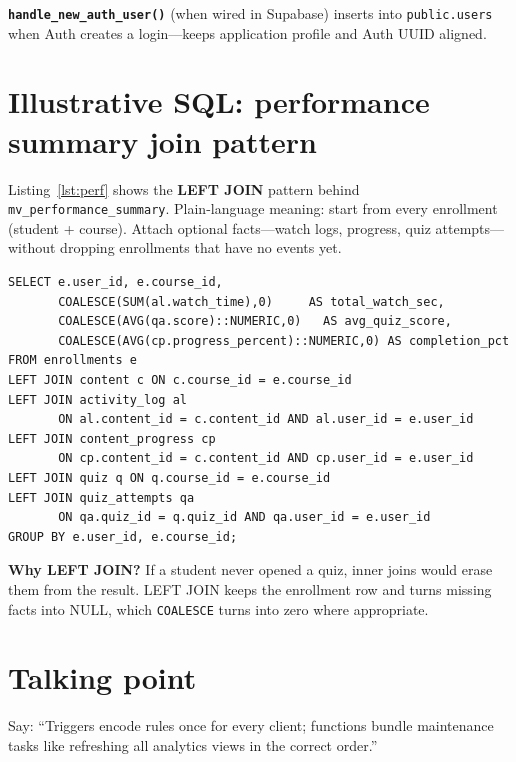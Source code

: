 \textbf{\texttt{handle\_new\_auth\_user()}} (when wired in Supabase) inserts into \texttt{public.users} when Auth creates a login---keeps application profile and Auth UUID aligned.

\section{Illustrative SQL: performance summary join pattern}
Listing~\ref{lst:perf} shows the \textbf{LEFT JOIN} pattern behind \texttt{mv\_performance\_summary}. Plain-language meaning: start from every enrollment (student + course). Attach optional facts---watch logs, progress, quiz attempts---without dropping enrollments that have no events yet.

\begin{lstlisting}[caption={Core join pattern for per-student per-course metrics (simplified)},label=lst:perf]
SELECT e.user_id, e.course_id,
       COALESCE(SUM(al.watch_time),0)     AS total_watch_sec,
       COALESCE(AVG(qa.score)::NUMERIC,0)   AS avg_quiz_score,
       COALESCE(AVG(cp.progress_percent)::NUMERIC,0) AS completion_pct
FROM enrollments e
LEFT JOIN content c ON c.course_id = e.course_id
LEFT JOIN activity_log al
       ON al.content_id = c.content_id AND al.user_id = e.user_id
LEFT JOIN content_progress cp
       ON cp.content_id = c.content_id AND cp.user_id = e.user_id
LEFT JOIN quiz q ON q.course_id = e.course_id
LEFT JOIN quiz_attempts qa
       ON qa.quiz_id = q.quiz_id AND qa.user_id = e.user_id
GROUP BY e.user_id, e.course_id;
\end{lstlisting}

\textbf{Why LEFT JOIN?} If a student never opened a quiz, inner joins would erase them from the result. LEFT JOIN keeps the enrollment row and turns missing facts into NULL, which \texttt{COALESCE} turns into zero where appropriate.

\section{Talking point}
Say: ``Triggers encode rules once for every client; functions bundle maintenance tasks like refreshing all analytics views in the correct order.''
